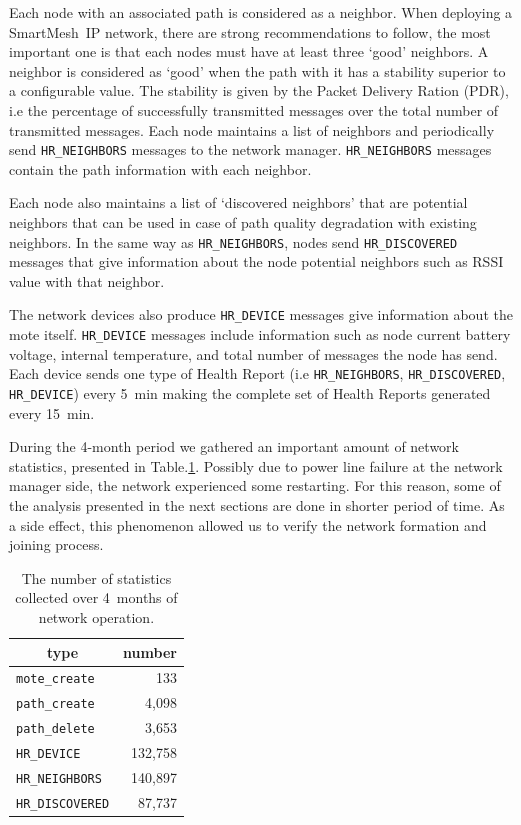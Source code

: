 \documentclass{sig-alternate}
\newcommand{\smip}           {SmartMesh~IP\xspace}
\newcommand{\HRNEIGHBORS}    {{\tt HR\_NEIGHBORS}\xspace}
\newcommand{\HRDISCOVERED}   {{\tt HR\_DISCOVERED}\xspace}
\newcommand{\HRDEVICE}       {{\tt HR\_DEVICE}\xspace}
\newcommand{\pathcreate}     {{\tt path\_create}\xspace}
\newcommand{\pathdelete}     {{\tt path\_delete}\xspace}
\newcommand{\motecreate}     {{\tt mote\_create}\xspace}
\newcommand{\HRNEIGHBORSTOTALNUMBER}     {140,897}
\begin{document}

Each node with an associated path is considered as a neighbor.
When deploying a \smip network, there are strong recommendations to follow, the most important one is that each nodes must have at least three `good' neighbors.
A neighbor is considered as `good' when the path with it has a stability superior to a configurable value.
The stability is given by the Packet Delivery Ration (PDR), i.e the percentage of successfully transmitted messages over the total number of transmitted messages.
Each node maintains a list of neighbors and periodically send \HRNEIGHBORS messages to the network manager.
\HRNEIGHBORS messages contain the path information with each neighbor.


Each node also maintains a list of `discovered neighbors' that are potential neighbors that can be used in case of path quality degradation with existing neighbors.
In the same way as \HRNEIGHBORS, nodes send \HRDISCOVERED messages that give information about the node potential neighbors such as RSSI value with that neighbor.


The network devices also produce \HRDEVICE messages give information about the mote itself.
\HRDEVICE messages include information such as node current battery voltage, internal temperature, and total number of messages the node has send.
Each device sends one type of Health Report (i.e \HRNEIGHBORS, \HRDISCOVERED, \HRDEVICE) every 5~min making the complete set of Health Reports generated every 15~min.


During the 4-month period we gathered an important amount of network statistics, presented in Table.\ref{tab:msg_stats}.
Possibly due to power line failure at the network manager side, the network experienced some restarting.
For this reason, some of the analysis presented in the next sections are done in shorter period of time.
As a side effect, this phenomenon allowed us to verify the network formation and joining process.

\begin{table}
    \centering
    \begin{tabular}{|l|r|}
        \hline
        \multicolumn{1}{|c|}{type} & \multicolumn{1}{|c|}{number} \\ \hline
        \hline
        \motecreate     &     133 \\ \hline
        \pathcreate     &   4,098 \\ \hline
        \pathdelete     &   3,653 \\ \hline
        \HRDEVICE       & 132,758 \\ \hline
        \HRNEIGHBORS    & \HRNEIGHBORSTOTALNUMBER \\ \hline
        \HRDISCOVERED   &  87,737 \\ \hline
    \end{tabular}
    \caption{The number of statistics collected over 4~months of network operation.}
    \label{tab:msg_stats}
\end{table}
\end{document}
